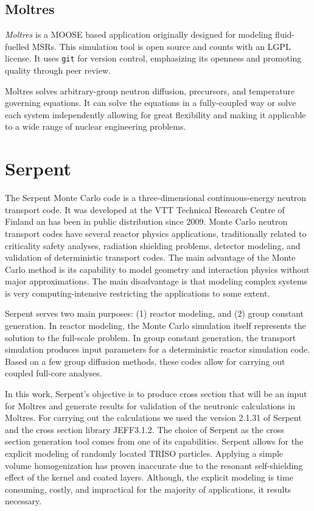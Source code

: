 \documentclass[11pt,letterpaper]{article}
\begin{document}
\subsection{Moltres}

\textit{Moltres} \cite{lindsay_introduction_2018} is a \gls{MOOSE} based application originally designed for modeling fluid-fuelled \glspl{MSR}.
This simulation tool is open source and counts with an LGPL license.
It uses \texttt{git} for version control, emphasizing its openness and promoting quality through peer review.

Moltres solves arbitrary-group neutron diffusion, precursors, and temperature governing equations.
It can solve the equations in a fully-coupled way or solve each system independently allowing for great flexibility and making it applicable to a wide range of nuclear engineering problems.

\section{Serpent}

The Serpent Monte Carlo code \cite{leppanen_development_2007} \cite{leppanen_calculation_2014} is a three-dimensional continuous-energy neutron transport code.
It was developed at the VTT Technical Research Centre of Finland an has been in public distribution since 2009.
Monte Carlo neutron transport codes have several reactor physics applications, traditionally related to criticality safety analyses, radiation shielding problems, detector modeling, and validation of deterministic transport codes.
The main advantage of the Monte Carlo method is its capability to model geometry and interaction physics without major approximations.
The main disadvantage is that modeling complex systems is very computing-intensive restricting the applications to some extent.

Serpent serves two main purposes: (1) reactor modeling, and (2) group constant generation.
In reactor modeling, the Monte Carlo simulation itself represents the solution to the full-scale problem.
In group constant generation, the transport simulation produces input parameters for a deterministic reactor simulation code.
Based on a few group diffusion methods, these codes allow for carrying out coupled full-core analyses.

In this work, Serpent’s objective is to produce cross section that will be an input for Moltres and generate results for validation of the neutronic calculations in Moltres.
For carrying out the calculations we used the version 2.1.31 of Serpent and the cross section library JEFF3.1.2.
The choice of Serpent as the cross section generation tool comes from one of its capabilities.
Serpent allows for the explicit modeling of randomly located TRISO particles.
Applying a simple volume homogenization has proven inaccurate due to the resonant self-shielding effect of the kernel and coated layers.
Although, the explicit modeling is time consuming, costly, and impractical for the majority of applications, it results necessary.
\end{document}
